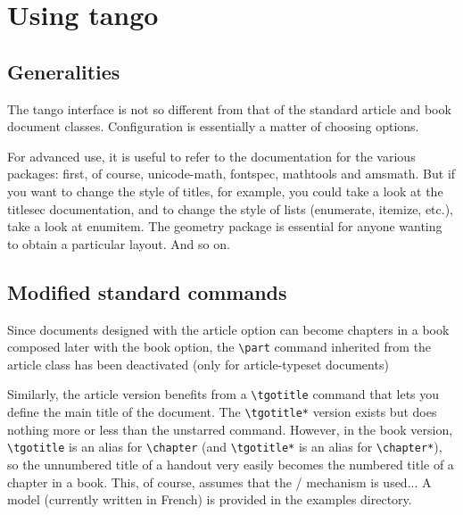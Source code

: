 \documentclass[english,ColorTheme=Red,FontSize=10pt]{tango}
\newcommand\TO[1]{\textsf{#1}}
\begin{document}
\section{Using tango}

\subsection{Generalities}
The tango interface is not so different from that of the standard \TO{article} and \TO{book} document classes. Configuration is essentially a matter of choosing options.

For advanced use, it is useful to refer to the documentation for the various packages: first, of course, \TO{unicode-math}, \TO{fontspec}, \TO{mathtools} and \TO{amsmath}. But if you want to change the style of titles, for example, you could take a look at the \TO{titlesec} documentation, and to change the style of lists (enumerate, itemize, etc.), take a look at \TO{enumitem}. The \TO{geometry} package is essential for anyone wanting to obtain a particular layout. And so on. 
\subsection{Modified standard commands}
Since documents designed with the \TO{article} option can become chapters in a book composed later with the \TO{book} option, the \verb+\part+ command inherited from the \TO{article} class has been deactivated (only for article-typeset documents)

Similarly, the \TO{article} version benefits from a \verb+\tgotitle+ command that lets you define the main title of the document. The \verb+\tgotitle*+ version exists but does nothing more or less than the unstarred command. However, in the \TO{book} version, \verb+\tgotitle+ is  an alias for \verb+\chapter+ (and \verb+\tgotitle*+ is  an alias for \verb+\chapter*+), so the unnumbered title of a handout very easily becomes the numbered title of a chapter in a book. This, of course, assumes that the \verb++/\verb++ mechanism is used... A model (currently written in French) is provided in the \TO{examples} directory.
\end{document}
